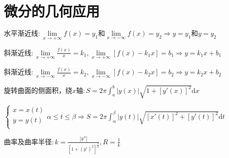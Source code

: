 \section{微分的几何应用}

\begin{spacing}{\hangju}
    \noindent $\mbox{水平渐近线}\colon \lim\limits_{x \to +\infty}{f(x)} = y_{1} \mbox{和}\lim\limits_{x \to -\infty}{f(x)} = y_{2} \Rightarrow y = y_{1}\mbox{和}y = y_{2}$

    \noindent $\mbox{斜渐近线}\colon \lim\limits_{x \to +\infty}{\frac{f(x)}{x}} = k_{1}, \lim\limits_{x \to +\infty}{[f(x) - k_{1}x]} = b_{1} \Rightarrow y = k_{1}x + b_{1}$

    \noindent $\mbox{斜渐近线}\colon \lim\limits_{x \to -\infty}{\frac{f(x)}{x}} = k_{2}, \lim\limits_{x \to -\infty}{[f(x) - k_{2}x]} = b_{2} \Rightarrow y = k_{2}x + b_{2}$

    \noindent $\mbox{旋转曲面的侧面积，绕}x\mbox{轴}\colon S = 2\pi\int_{a}^{b}{|y(x)|\sqrt{1 + [y'(x)]^2}\mathrm{d}x}$

    \noindent $\left\{\begin{array}{l}
        x = x(t)\\
        y = y(t)\\
    \end{array}\right. \alpha \le t \le \beta \Rightarrow S = 2\pi\int_{\alpha}^{\beta}{|y(t)|\sqrt{[x'(t)]^2 + [y'(t)]^2}\mathrm{d}t}$

    \noindent $\mbox{曲率及曲率半径}\colon k = \frac{|y''|}{[1 + (y')^2]^{\frac{3}{2}}}, R = \frac{1}{k}$
\end{spacing}
